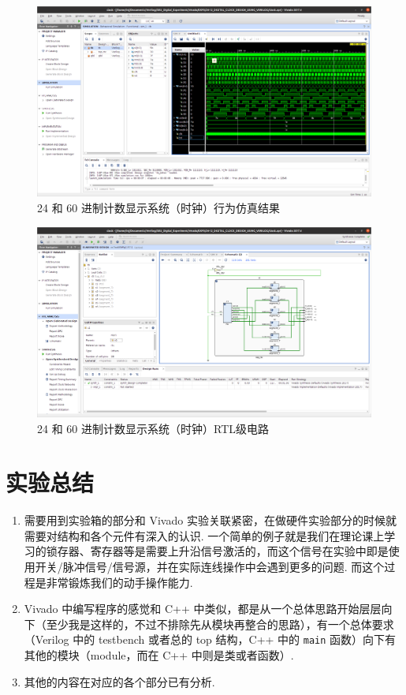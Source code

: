 \documentclass[11pt]{SEU-Digital-Report}
\begin{document}
    \newpage
    \begin{figure}[htbp]
      \centering
      \includegraphics[width=\linewidth]{fig/vivado/24_60_simu.png}
      \caption{24 和 60 进制计数显示系统（时钟）行为仿真结果\protect\footnotemark}
      \label{fig:20_60_simu}
    \end{figure}
    \begin{figure}[h!]
      \centering
      \includegraphics[width=\linewidth]{fig/vivado/24_60_RTL.png}
      \caption{24 和 60 进制计数显示系统（时钟）RTL级电路}
      \label{fig:20_60_RTL}
    \end{figure}


  \section{实验总结}

    \begin{enumerate}
      \item 需要用到实验箱的部分和 Vivado 实验关联紧密，在做硬件实验部分的时候就需要对结构和各个元件有深入的认识. 一个简单的例子就是我们在理论课上学习的锁存器、寄存器等是需要上升沿信号激活的，而这个信号在实验中即是使用开关/脉冲信号/信号源，并在实际连线操作中会遇到更多的问题. 而这个过程是非常锻炼我们的动手操作能力.
      \item Vivado 中编写程序的感觉和 C++ 中类似，都是从一个总体思路开始层层向下（至少我是这样的，不过不排除先从模块再整合的思路），有一个总体要求（Verilog 中的 testbench 或者总的 top 结构，C++ 中的 \texttt{main} 函数）向下有其他的模块（module，而在 C++ 中则是类或者函数）.
      \item 其他的内容在对应的各个部分已有分析.
    \end{enumerate}
\end{document}

